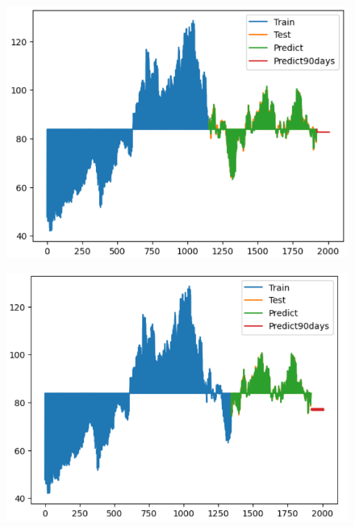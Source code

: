 \documentclass{article}
\begin{document}
\begin{multicols}{2}
\begin{figure}[H]
    \centering
    \begin{minipage}{0.15\textwidth}
    \centering
    \includegraphics[width=1\textwidth]{Image/XGBoost/SONY_6_4_90.png}
   
    \label{fig:1}
    \end{minipage}%
    \begin{minipage}{0.15\textwidth}
    \centering
    \includegraphics[width=1\textwidth]{Image/XGBoost/SONY_7_3_90.png}
  

\end{minipage}
\end{figure}
\end{multicols}
\end{document}
